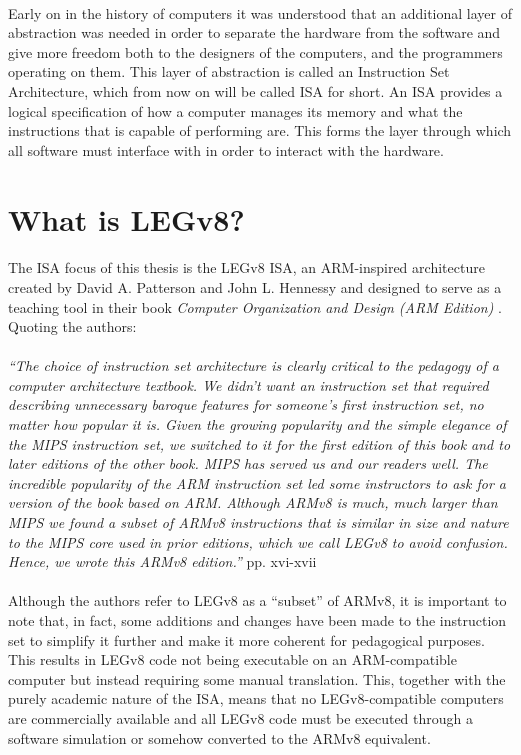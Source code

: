 \paragraph{}
Early on in the history of computers it was understood that an additional layer of abstraction was needed in order to separate the hardware from the software
and give more freedom both to the designers of the computers, and the programmers operating on them. This layer of abstraction is called an Instruction Set Architecture,
which from now on will be called ISA for short. An ISA provides a logical specification of how a computer manages its memory and what the instructions that is
capable of performing are. This forms the layer through which all software must interface with in order to interact with the hardware.

\section{What is LEGv8?}

\paragraph{}
The ISA focus of this thesis is the LEGv8 ISA, an ARM-inspired architecture created by David A. Patterson and John L. Hennessy and designed to serve as a teaching
tool in their book \emph{Computer Organization and Design (ARM Edition)} \cite{patterson2016computer}.  Quoting the authors:
\paragraph{}
\emph{``The choice of instruction set architecture is clearly critical to the pedagogy of a
computer architecture textbook. We didn’t want an instruction set that required
describing unnecessary baroque features for someone’s first instruction set, no
matter how popular it is.
Given the growing popularity and the simple elegance of the MIPS instruction
set, we switched to it for the first edition of this book and to later editions of the
other book. MIPS has served us and our readers well.
The incredible popularity of the ARM instruction set led some instructors to ask for a version of the book based on
ARM. Although ARMv8 is much, much larger than MIPS we found a subset of ARMv8
instructions that is similar in size and nature to the MIPS core used in prior editions,
which we call LEGv8 to avoid confusion. Hence, we wrote this ARMv8 edition.''} pp. xvi-xvii
\paragraph{}
Although the authors refer to LEGv8 as a ``subset'' of ARMv8, it is important to note that, in fact, some additions and changes have been made to the instruction set to simplify it further and make it more coherent for pedagogical purposes. This results in LEGv8 code not being executable on an ARM-compatible computer but instead requiring some manual translation. This, together with the purely academic nature of the ISA, means that no LEGv8-compatible computers are commercially available and all LEGv8 code must be executed through a software simulation or somehow converted to the ARMv8 equivalent.

